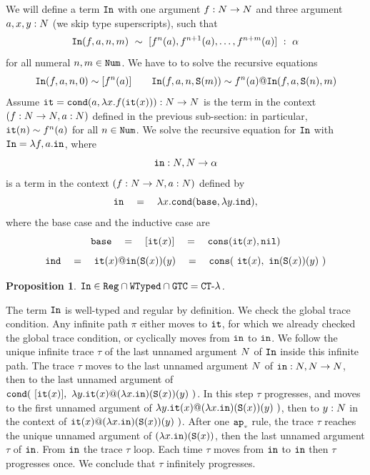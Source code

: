 \documentclass{article}
\newtheorem{proposition}[theorem]{Proposition}
\newenvironment{proof}[1][Proof]{\begin{trivlist}
\item[\hskip \labelsep {\bfseries #1}]}{\end{trivlist}}
\begin{document}
We will define a term ${\tt In}$ with one argument $f:{N} \rightarrow {N}$ and three argument
$a,x,y:{N}$ (we skip type superscripts), such that 
$$
{\tt In}(f,a,n,m) \  \sim \ [f^n(a), f^{n+1}(a), \ldots, f^{n+m}(a)] \  : \ \alpha
$$ 
for all numeral $n,m \in {\tt Num}$. 
We have to to solve the recursive equations 
$$
\Interval(f,a,n,0)  \sim [f^n(a)]
\ \ \ \ \ \ 
\Interval(f,a,n,\Succ (m))  \sim f^n(a) @ \Interval(f,a,\Succ(n),m)
$$ 
Assume ${\tt it} = {\tt cond} (a, \lambda x.f({\tt it}(x))):{N} \rightarrow {N}$ is the term
in the context $(f:{N}\rightarrow{N}, a:{N})$ defined 
in the previous sub-section: in particular, ${\tt it}(n) \sim f^n(a)$ for all $n \in {\tt Num}$.
We solve the recursive equation for ${\tt In}$ with ${\tt In} = \lambda f,a.{\tt in}$,
where 
$$
{\tt in}:{N},{N} \rightarrow \alpha
$$
is a term in the context $(f:{N}\rightarrow{N}, a:{N})$ defined by 
$$
\interval 
\ \ \ = \ \ \ 
\lambda x.\cond (\base,  \lambda y.\inductive),
$$
where the base case and the inductive case are
$$
\base 
\ \ \ =\ \ \  
[\iter(x)]
\ \ \ =\ \ \ 
\cons(\iter(x),\nil)
$$
$$
\inductive 
\ \ \ = \ \ \ 
\iter(x) @ \interval(\Succ(x))(y)
\ \ \ = \ \ \  
\cons(\ \iter(x), \ \interval(\Succ(x))(y) \ )
$$ 


\begin{proposition}
${\tt In} \in {\tt Reg} \cap {\tt WTyped} \cap {\tt GTC} = { {\tt CT} \mbox{-} \lambda}$.
\end{proposition}

\begin{proof}
The term ${\tt In}$ is well-typed and regular by definition. We check the global trace condition.
Any infinite path $\pi$ either moves to ${\tt it}$, for which we already checked the global trace condition,
or cyclically moves from ${\tt in}$ to ${\tt in}$.
We follow the unique infinite 
trace $\tau$ of the last unnamed argument ${N}$ of ${\tt In}$ inside this infinite path.
The trace $\tau$ moves to the last unnamed argument ${N}$ of  
${\tt in}:{N},{N} \rightarrow {N}$, then to the last unnamed argument of
$\cond (\ [\iter(x)],  \  \lambda y.\iter(x) @ (\lambda x.\interval)(\Succ(x))(y) \ )$.
In this step $\tau$ progresses, and moves to 
the first unnamed argument of $\lambda y.{\tt it}(x) @ (\lambda x.{\tt in})({\tt S}(x))(y) \ )$,
then to $y:{N}$ in the context of $\iter(x) @ (\lambda x.\interval)(\Succ(x))(y) \ )$.
After one ${{\tt ap}_{\mbox{\tiny $v$}}}$ rule, the trace $\tau$ reaches the unique unnamed argument of 
$(\lambda x.{\tt in})({\tt S}(x))$, then the last unnamed argument $\tau$ of ${\tt in}$. 
From ${\tt in}$ the trace $\tau$ loop. Each time $\tau$ moves from ${\tt in}$ to ${\tt in}$
then $\tau$ progresses once. We conclude that $\tau$ infinitely progresses.
\end{proof}
\end{document}
